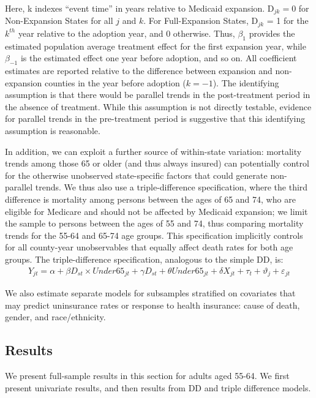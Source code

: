 \documentclass[12pt]{article}%
\begin{document}
Here, k indexes ``event time'' in years relative to Medicaid expansion. D$_{jk} = 0$ for Non-Expansion States for all $j$ and $k$. 
For Full-Expansion States, D$_{jk}$ = 1 for the $k^{th}$ year relative to the adoption year, and 0 otherwise. 
Thus, $\beta_{1}$ provides the estimated population average treatment effect for the first expansion year, while $\beta_{-1}$ is the estimated effect one year before adoption, and so on.  
All coefficient estimates are reported relative to the difference between expansion and non-expansion counties in the year before adoption ($k = -1$). 
The identifying assumption is that there would be parallel trends in the post-treatment period in the absence of treatment. While this assumption is not directly testable, evidence for parallel trends in the pre-treatment period is suggestive that this identifying assumption is reasonable.  


In addition, we can exploit a further source of within-state variation: mortality trends among those 65 or older (and thus always insured) can potentially control for the otherwise unobserved state-specific factors that could generate non-parallel trends. 
We thus also use a triple-difference specification, where the third difference is mortality among persons between the ages of 65 and 74, who are eligible for Medicare and should not be affected by Medicaid expansion; we limit the sample to persons between the ages of 55 and 74, thus comparing mortality trends for the 55-64 and 65-74 age groups. 
This specification implicitly controls for all county-year unobservables that equally affect death rates for both age groups.  
The triple-difference specification, analogous to the simple DD, is:
\vspace{-.5cm}
\begin{align}
    Y_{jt}=\alpha + \beta D_{st}\times Under65_{jt} + \gamma D_{st} + \theta Under65_{jt} + \delta X_{jt} + \tau_{t} + \vartheta_{j} + \varepsilon_{jt} \label{eq:ddd}
\end{align}


We also estimate separate models for subsamples stratified on covariates that may predict uninsurance rates or response to health insurance: cause of death, gender, and race/ethnicity. 


\subsection{Results}

We present full-sample results in this section for adults aged 55-64.  We first present univariate results, and then results from DD and triple difference models. 
\end{document}
